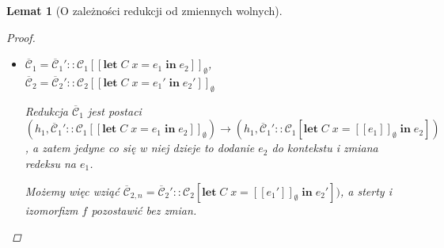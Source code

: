 \documentclass[]{pracamgr}
\renewcommand \| {\hspace{0.75em} | \hspace{0.75em} }
\renewcommand \[ {[\![}
\renewcommand \] {]\!]}
\newtheorem{lemma}{Lemat}
\theoremstyle{definition}
\newcommand{\mmod}{\mu\xspace}
\newcommand{\jlet}{\mathbf{let}\xspace}
\newcommand{\jin}{\mathbf{in}\xspace}
\newcommand{\jnew}{\mathbf{new}\xspace}
\newcommand{\letin}[4]{\jlet\; #1\; #2 = #3\; \jin\; #4\xspace}
\newcommand{\newin}[3]{\jnew\; #1\; #2(#3)\xspace}
\newcommand{\ctxt}{\mathcal{C}\xspace}
\newcommand{\ctxts}{\overline{\ctxt}}
\newcommand{\alloc}{\mathsf{alloc}\xspace}
\newcommand{\fields}{\mathsf{flds}\xspace}
\newcommand{\emptyclass}[1]{\mathsf{empty}_{#1}\xspace}
\begin{document}
\begin{lemma}[O zależności redukcji od zmiennych wolnych]{\ }
\begin{proof}
\begin{itemize}
 $\ctxts_2 = \ctxts_2'::\ctxt_2\[ \newin{\mmod}{C}{l_1',\ldots,l_k'}\]_\emptyset$ \\ \\
 Redukcja $\ctxts_1$ jest postaci
 $(h_1,  \ctxts_1':: \ctxt_1\[ \newin{\mmod}{C}{l_1,\ldots,l_k}\] _\emptyset) \rightarrow (h_{1, n}, \ctxts_1' :: \ctxt_1\[ l_0\] _\emptyset)$,
gdzie
$ \alloc(h_1, \ctxts_1', C)=(l_0, h),\; \fields(C) = x_1, \dots, x_k,\;
o=\emptyclass{C}\{x_1 \mapsto  l_1,\ldots,x_k~\mapsto~l_k\}, \; h_{1,n} = h\{l_0 \mapsto o\}$.
Nowa sterta $h_{1,n}$ jest zatem po prostu stertą $h_1$ z dodatkowym nowym obiektem $o$ pod nową lokacją $l_0$.
Weźmy zatem $\hbase_{1,n} = \hbase_1\{l_0 \mapsto o\}$.
Spełnia ona warunki 4 i 6, ponieważ jedyną nową lokacją na stosie jest $l_0$, które trafiło właśnie do $\hbase_{1,n}$.

Weźmy teraz $(l_0', h') = \alloc(h_2, \ctxts_2', C),\;
o'=\emptyclass{C}\{x_1 \mapsto  l_1',\ldots,x_k \mapsto  l_k'\}, \; h_{2,n} = h'\{l_0' \mapsto  o'\}$.
Mamy wtedy 
$(h_2, \ctxts_2) \rightarrow (h_{2, n}, \ctxts_2' :: \ctxt_2\[ l_0'\] _\emptyset))$, a zatem biorąc takie $h_{2, n}$
i $\ctxts_{2,n} = \ctxts_2' :: \ctxt_2\[ l_0'\] _\emptyset$ mamy spełnione też warunki 7 i 8.

Jest to jedyny przypadek, w którym na stercie pojawia się nowa lokacja, a zatem należy zmodyfikować
izomorfizm $f$.
Niech więc $\hbase_{2,n} = \hbase_2\{l_0' \mapsto o'\}$ i $f' = f\{l_0 \mapsto l_0'\}$.
Warunki 1 i 5 są w oczywisty sposób spełnione.
Warunek 2 jest spełniony, ponieważ z założenia $f$ było zdefiniowane tylko na lokacjach z $\hbase_1$, a $l_0$ trafiło do $\hbase_{1,n}$.
Wreszcie, warunek 3 jest spełniony, ponieważ z założenia o izomorfizmie $\ctxts_1$ i $\ctxts_2$,
dla $j = 1, \ldots, k$ mamy $f'(l_j) = l_j'$, a z definicji $f'$, $f'(l_0) = l_0'$.

\item $\ctxts_1 = \ctxts_1'::\ctxt_1\[\letin{C}{x}{e_1}{e_2}\]_\emptyset$, \;\;
      $\ctxts_2 = \ctxts_2'::\ctxt_2\[\letin{C}{x}{e_1'}{e_2'}\]_\emptyset$
      
Redukcja $\ctxts_1$ jest postaci
$(h_1, \ctxts_1' :: \ctxt_1\[ \letin{C}{x}{e_1}{e_2}\] _\emptyset) \rightarrow
 (h_1, \ctxts_1' :: \ctxt_1 [\letin{C}{x}{\[ e_1\] _\emptyset}{e_2}])$, a zatem
jedyne co się w niej dzieje to dodanie $e_2$ do kontekstu i zmiana redeksu na $e_1$.

Możemy więc wziąć
$\ctxts_{2,n} = \ctxts_2' :: \ctxt_2 [\letin{C}{x}{\[ e_1'\] _\emptyset}{e_2'}])$,
a sterty i izomorfizm $f$ pozostawić bez zmian.


\end{itemize}
\end{proof}
\end{lemma}
\end{document}
